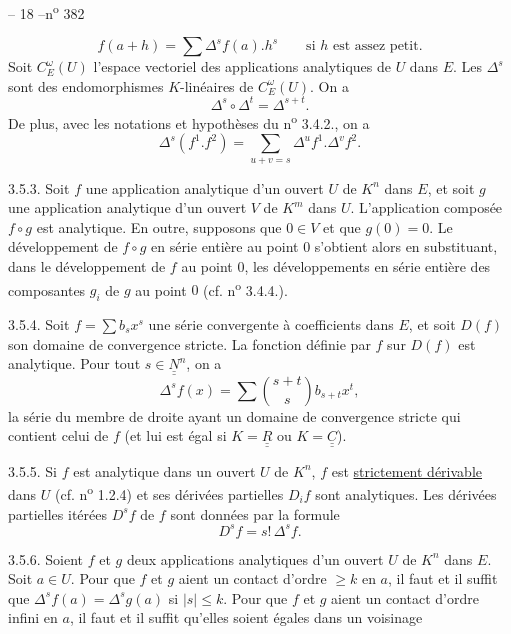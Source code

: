\begin{center}-- 18 --\hfill n\textsuperscript{o} 382\end{center}
\[
f(a+h)=\sum\Delta^s f(a).h^s\qquad\text{si $h$ est assez petit.}
\]
Soit $C_E^\omega(U)$ l'espace vectoriel des applications analytiques de $U$ dans $E$. Les $\Delta^s$ sont des endomorphismes $K$-linéaires de $C_E^\omega(U)$. On a
\[
\Delta^s\circ\Delta^t=\Delta^{s+t}.
\]
De plus, avec les notations et hypothèses du n\textsuperscript{o} 3.4.2., on a
\[
\Delta^s(f^1.f^2)=\sum_{u+v=s}\Delta^u f^1.\Delta^v f^2.
\]

3.5.3. Soit $f$ une application analytique d'un ouvert $U$ de $K^n$ dans $E$, et soit $g$ une application analytique d'un ouvert $V$ de $K^m$ dans $U$. L'application composée $f\circ g$ est analytique. En outre, supposons que $0\in V$ et que $g(0)=0$. Le développement de $f\circ g$ en série entière au point $0$ s'obtient alors en substituant, dans le développement de $f$ au point $0$, les développements en série entière des composantes $g_i$ de $g$ au point $0$ (cf. n\textsuperscript{o} 3.4.4.).

3.5.4. Soit $f=\sum b_s x^s$ une série convergente à coefficients dans $E$, et soit $D(f)$ son domaine de convergence stricte. La fonction définie par $f$ sur $D(f)$ est analytique. Pour tout $s\in\underline{\underline{N}}^n$, on a
\[
\Delta^s f(x)=\sum\binom{s+t}{s}b_{s+t}x^t,
\]
la série du membre de droite ayant un domaine de convergence stricte qui contient celui de $f$ (et lui est égal si $K=\underline{\underline{R}}$ ou $K=\underline{\underline{C}}$).

3.5.5. Si $f$ est analytique dans un ouvert $U$ de $K^n$, $f$ est \uline{strictement dérivable} dans $U$ (cf. n\textsuperscript{o} 1.2.4) et ses dérivées partielles $D_i f$ sont analytiques. Les dérivées partielles itérées $D^s f$ de $f$ sont données par la formule
\[
D^s f=s!\,\Delta^s f.
\]

3.5.6. Soient $f$ et $g$ deux applications analytiques d'un ouvert $U$ de $K^n$ dans $E$. Soit $a\in U$. Pour que $f$ et $g$ aient un contact d'ordre $\geq k$ en $a$, il faut et il suffit que $\Delta^s f(a)=\Delta^s g(a)$ si $|s|\leq k$. Pour que $f$ et $g$ aient un contact d'ordre infini en $a$, il faut et il suffit qu'elles soient égales dans un voisinage

